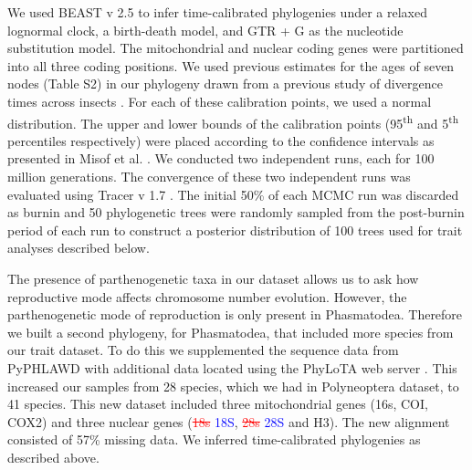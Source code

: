 \documentclass[]{rsos}%
\begin{document}
We used BEAST v 2.5 \cite{bouckaert2014beast} to infer time-calibrated phylogenies under a relaxed lognormal clock, a birth-death model, and GTR + G as the nucleotide substitution model.
The mitochondrial and nuclear coding genes were partitioned into all three coding positions. 
We used previous estimates for the ages of seven nodes (Table S2) in our phylogeny drawn from a previous study of divergence times across insects \cite{misof2014phylogenomics}.
For each of these calibration points, we used a normal distribution.
The upper and lower bounds of the calibration points (95\textsuperscript{th} and 5\textsuperscript{th} percentiles respectively) were placed according to the confidence intervals as presented in Misof et al. \cite{misof2014phylogenomics}. 
We conducted two independent runs, each for 100 million generations.
The convergence of these two independent runs was evaluated using Tracer v 1.7 \cite{rambaut2018tracer}.
The initial 50\% of each MCMC run was discarded as burnin and 50 phylogenetic trees were randomly sampled from the post-burnin period of each run to construct a posterior distribution of 100 trees used for trait analyses described below.

The presence of parthenogenetic taxa in our dataset allows us to ask how reproductive mode affects chromosome number evolution.
However, the parthenogenetic mode of reproduction is only present in Phasmatodea.
Therefore we built a second phylogeny, for Phasmatodea, that included more species from our trait dataset.
To do this we supplemented the sequence data from PyPHLAWD with additional data located using the PhyLoTA web server \cite{sanderson2008}.
This increased our samples from 28 species, which we had in Polyneoptera dataset, to 41 species. 
This new dataset included three mitochondrial genes (16s, COI, COX2) and three
nuclear genes (\textcolor{red}{\st{18s}} \textcolor{blue}{18S}, \textcolor{red}{\st{28s}} \textcolor{blue}{28S} and H3).
The new alignment consisted of 57\% missing data.
We inferred time-calibrated phylogenies as described above.
\end{document}
